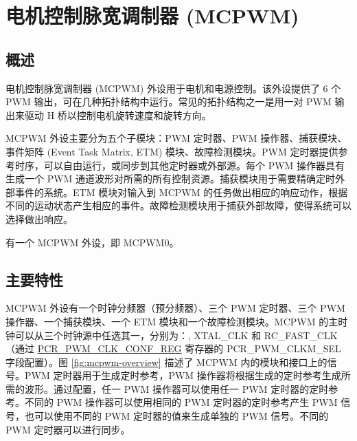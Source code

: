\documentclass[main\_\_CN.tex]{subfiles}
\begin{document}

\ifglobal
\else
    \listoftodos
    {\let\clearpage\relax \listofdonetodos}
    \tableofcontents
\fi



\hypertarget{mcpwm}{}
\chapter{电机控制脉宽调制器 (MCPWM)}
\label{mod:mcpwm}

\section{概述}

电机控制脉宽调制器 (MCPWM) 外设用于电机和电源控制。该外设提供了 6 个 PWM 输出，可在几种拓扑结构中运行。常见的拓扑结构之一是用一对 PWM 输出来驱动 H 桥以控制电机旋转速度和旋转方向。

MCPWM 外设主要分为五个子模块：PWM 定时器、PWM 操作器、捕获模块、事件矩阵 (Event Task Matrix, ETM) 模块、故障检测模块。PWM 定时器提供参考时序，可以自由运行，或同步到其他定时器或外部源。每个 PWM 操作器具有生成一个 PWM 通道波形对所需的所有控制资源。捕获模块用于需要精确定时外部事件的系统。ETM 模块对输入到 MCPWM 的任务做出相应的响应动作，根据不同的运动状态产生相应的事件。故障检测模块用于捕获外部故障，使得系统可以选择做出响应。

\chipname{} 有一个 MCPWM 外设，即 MCPWM0。

\section{主要特性}

MCPWM 外设有一个时钟分频器（预分频器）、三个 PWM 定时器、三个 PWM 操作器、一个捕获模块、一个 ETM 模块和一个故障检测模块。MCPWM 的主时钟可以从三个时钟源中任选其一，分别为：, XTAL\_CLK 和 RC\_FAST\_CLK（通过 \hyperref[regdesc:PCRPWMCLKCONFREG]{PCR\_PWM\_CLK\_CONF\_REG} 寄存器的 PCR\_PWM\_CLKM\_SEL 字段配置）。图 \ref{fig:mcpwm-overview} 描述了 MCPWM 内的模块和接口上的信号。PWM 定时器用于生成定时参考，PWM 操作器将根据生成的定时参考生成所需的波形。通过配置，任一 PWM 操作器可以使用任一 PWM 定时器的定时参考。不同的 PWM 操作器可以使用相同的 PWM 定时器的定时参考产生 PWM 信号，也可以使用不同的 PWM 定时器的值来生成单独的 PWM 信号。不同的 PWM 定时器可以进行同步。
\end{document}
